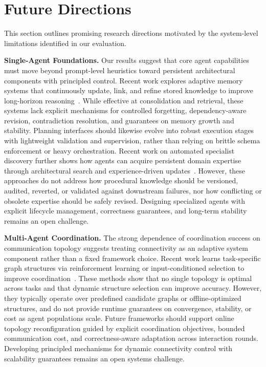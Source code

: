 \section{Future Directions}
\label{sec:future_work}

This section outlines promising research directions motivated by the system-level limitations identified in our evaluation.

\smallskip
\noindent\textbf{Single-Agent Foundations.}  
Our results suggest that core agent capabilities must move beyond prompt-level heuristics toward persistent architectural components with principled control. Recent work explores adaptive memory systems that continuously update, link, and refine stored knowledge to improve long-horizon reasoning~\cite{kang2025memory,xu2025mem}. While effective at consolidation and retrieval, these systems lack explicit mechanisms for controlled forgetting, dependency-aware revision, contradiction resolution, and guarantees on memory growth and stability.  
%
Planning interfaces should likewise evolve into robust execution stages with lightweight validation and supervision, rather than relying on brittle schema enforcement or heavy orchestration. Recent work on automated specialist discovery further shows how agents can acquire persistent domain expertise through architectural search and experience-driven updates~\cite{vuautomated}. However, these approaches do not address how procedural knowledge should be versioned, audited, reverted, or validated against downstream failures, nor how conflicting or obsolete expertise should be safely revised. Designing specialized agents with explicit lifecycle management, correctness guarantees, and long-term stability remains an open challenge.\shorten


\smallskip
\noindent\textbf{Multi-Agent Coordination.}
The strong dependence of coordination success on communication topology suggests treating connectivity as an adaptive system component rather than a fixed framework choice. Recent work learns task-specific graph structures via reinforcement learning or input-conditioned selection to improve coordination~\cite{leong2025amas,li2025adaptive}. These methods show that no single topology is optimal across tasks and that dynamic structure selection can improve accuracy. However, they typically operate over predefined candidate graphs or offline-optimized structures, and do not provide runtime guarantees on convergence, stability, or cost as agent populations scale.  
%
Future frameworks should support online topology reconfiguration guided by explicit coordination objectives, bounded communication cost, and correctness-aware adaptation across interaction rounds. Developing principled mechanisms for dynamic connectivity control with scalability guarantees remains an open systems challenge.\shorten


